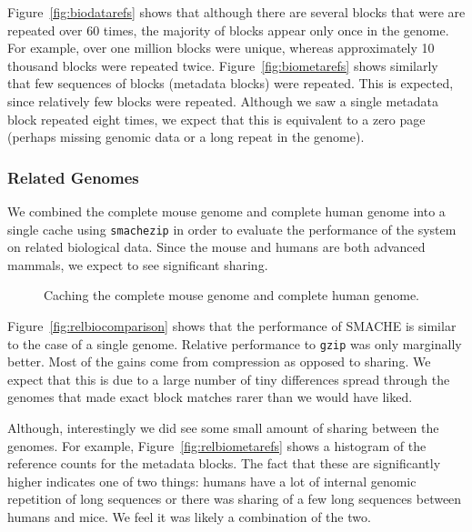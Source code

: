 \documentclass{sigplanconf}[11pt]
\begin{document}
Figure~\ref{fig:biodatarefs} shows that although there are several blocks that
were are repeated over 60 times, the majority of blocks appear only once in the
genome.  For example, over one million blocks were unique, whereas
approximately 10 thousand blocks were repeated twice.
Figure~\ref{fig:biometarefs} shows similarly that few sequences of blocks
(metadata blocks) were repeated.  This is expected, since relatively few blocks
were repeated.  Although we saw a single metadata block repeated eight times,
we expect that this is equivalent to a zero page (perhaps missing genomic data
or a long repeat in the genome).

\subsubsection*{Related Genomes}

We combined the complete mouse genome and complete human genome into a single
cache using {\tt smachezip} in order to evaluate the performance of the system
on related biological data.  Since the mouse and humans are both advanced
mammals, we expect to see significant sharing.

\begin{figure}[h]
\begin{center}
\end{center}
\begin{center}
\caption{Caching the complete mouse genome and complete human genome.}
\end{center}
\end{figure}

Figure~\ref{fig:relbiocomparison} shows that the performance of SMACHE is
similar to the case of a single genome.  Relative performance to {\tt gzip} was
only marginally better. Most of the gains come from compression as opposed to
sharing.  We expect that this is due to a large number of tiny differences
spread through the genomes that made exact block matches rarer than we would
have liked.

Although, interestingly we did see some small amount of sharing between the
genomes.  For example, Figure~\ref{fig:relbiometarefs} shows a histogram of the
reference counts for the metadata blocks.  The fact that these are
significantly higher indicates one of two things: humans have a lot of internal
genomic repetition of long sequences or there was sharing of a few long
sequences between humans and mice.  We feel it was likely a combination of the
two.
\end{document}
